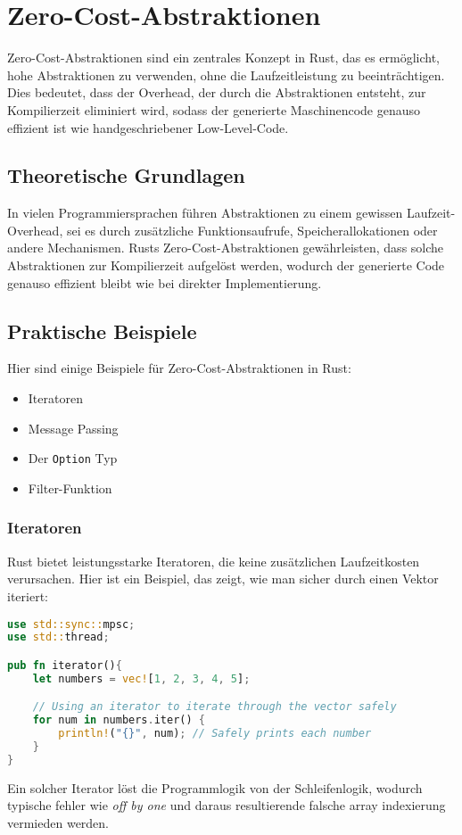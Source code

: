 \chapter{Zero-Cost-Abstraktionen}

Zero-Cost-Abstraktionen sind ein zentrales Konzept in Rust, das es ermöglicht, hohe Abstraktionen zu verwenden, ohne die Laufzeitleistung zu beeinträchtigen. 
Dies bedeutet, dass der Overhead, der durch die Abstraktionen entsteht, zur Kompilierzeit eliminiert wird, sodass der generierte Maschinencode genauso effizient ist wie handgeschriebener Low-Level-Code.

\section{Theoretische Grundlagen}

In vielen Programmiersprachen führen Abstraktionen zu einem gewissen Laufzeit-Overhead, sei es durch zusätzliche Funktionsaufrufe, Speicherallokationen oder andere Mechanismen.
Rusts Zero-Cost-Abstraktionen gewährleisten, dass solche Abstraktionen zur Kompilierzeit aufgelöst werden, wodurch der generierte Code genauso effizient bleibt wie bei direkter Implementierung.

\section{Praktische Beispiele}

Hier sind einige Beispiele für Zero-Cost-Abstraktionen in Rust:

\begin{itemize}
    \item Iteratoren
    \item Message Passing
    \item Der \texttt{Option} Typ
    \item Filter-Funktion
\end{itemize}

\subsection{Iteratoren}

Rust bietet leistungsstarke Iteratoren, die keine zusätzlichen Laufzeitkosten verursachen. 
Hier ist ein Beispiel, das zeigt, wie man sicher durch einen Vektor iteriert:

\begin{lstlisting}[language=Rust, caption=Iterator-Beispiel]
use std::sync::mpsc;
use std::thread;

pub fn iterator(){
    let numbers = vec![1, 2, 3, 4, 5];

    // Using an iterator to iterate through the vector safely
    for num in numbers.iter() {
        println!("{}", num); // Safely prints each number
    }
}
\end{lstlisting}
Ein solcher Iterator löst die Programmlogik von der Schleifenlogik, wodurch typische fehler wie \textit{off by one} und daraus resultierende falsche array indexierung vermieden werden.
\cleardoublepage
